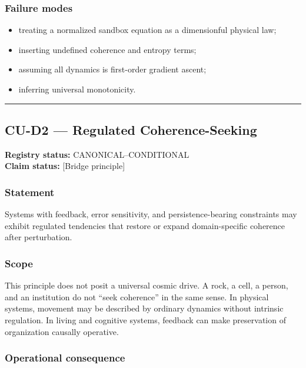 \documentclass[
  11pt,
]{article}
\providecommand{\tightlist}{%
  \setlength{\itemsep}{0pt}\setlength{\parskip}{0pt}}
\begin{document}
\subsubsection{Failure modes}\label{failure-modes-15}

\begin{itemize}
\tightlist
\item
  treating a normalized sandbox equation as a dimensionful physical law;
\item
  inserting undefined coherence and entropy terms;
\item
  assuming all dynamics is first-order gradient ascent;
\item
  inferring universal monotonicity.
\end{itemize}

\begin{center}\rule{0.5\linewidth}{0.5pt}\end{center}

\subsection{CU-D2 --- Regulated
Coherence-Seeking}\label{cu-d2-regulated-coherence-seeking}

\textbf{Registry status:} CANONICAL--CONDITIONAL\\
\textbf{Claim status:} {[}Bridge principle{]}

\subsubsection{Statement}\label{statement-42}

Systems with feedback, error sensitivity, and persistence-bearing
constraints may exhibit regulated tendencies that restore or expand
domain-specific coherence after perturbation.

\subsubsection{Scope}\label{scope-17}

This principle does not posit a universal cosmic drive. A rock, a cell,
a person, and an institution do not ``seek coherence'' in the same
sense. In physical systems, movement may be described by ordinary
dynamics without intrinsic regulation. In living and cognitive systems,
feedback can make preservation of organization causally operative.

\subsubsection{Operational
consequence}\label{operational-consequence-24}
\end{document}
